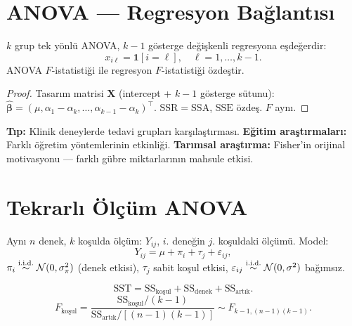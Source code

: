 \section{ANOVA --- Regresyon Bağlantısı}
\label{sec:anova_regresyon}

\begin{teorem}[ANOVA = regresyon]\label{thm:anova_regresyon}
$k$ grup tek yönlü ANOVA, $k-1$ gösterge değişkenli regresyona eşdeğerdir:
\[
  x_{i\ell} = \mathbf{1}[i=\ell], \quad \ell=1,\ldots,k-1.
\]
ANOVA $F$-istatistiği ile regresyon $F$-istatistiği özdeştir.
\end{teorem}

\begin{proof}
Tasarım matrisi $\mathbf{X}$ (intercept + $k-1$ gösterge sütunu): $\hat{\boldsymbol\beta}=(\mu,\alpha_1-\alpha_k,\ldots,\alpha_{k-1}-\alpha_k)^\top$. $\mathrm{SSR}=\mathrm{SSA}$, $\mathrm{SSE}$ özdeş. $F$ aynı.
\end{proof}

\begin{disiplinlerarasibaglan}
\textbf{Tıp:} Klinik deneylerde tedavi grupları karşılaştırması. \textbf{Eğitim araştırmaları:} Farklı öğretim yöntemlerinin etkinliği. \textbf{Tarımsal araştırma:} Fisher'in orijinal motivasyonu --- farklı gübre miktarlarının mahsule etkisi.
\end{disiplinlerarasibaglan}

\section{Tekrarlı Ölçüm ANOVA}
\label{sec:tekrarli_olcum}

\begin{tanim}\label{def:tekrarli_olcum}
Aynı $n$ denek, $k$ koşulda ölçüm: $Y_{ij}$, $i$. deneğin $j$. koşuldaki ölçümü. Model:
\[
  Y_{ij} = \mu + \pi_i + \tau_j + \varepsilon_{ij},
\]
$\pi_i\overset{\text{i.i.d.}}{\sim}\mathcal{N}(0,\sigma_\pi^2)$ (denek etkisi), $\tau_j$ sabit koşul etkisi, $\varepsilon_{ij}\overset{\text{i.i.d.}}{\sim}\mathcal{N}(0,\sigma^2)$ bağımsız.
\end{tanim}

\begin{teorem}\label{thm:tekrarli_sst}
\[
  \mathrm{SST} = \mathrm{SS}_{\text{koşul}} + \mathrm{SS}_{\text{denek}} + \mathrm{SS}_{\text{artık}}.
\]
\[
  F_{\text{koşul}} = \frac{\mathrm{SS}_{\text{koşul}}/(k-1)}{\mathrm{SS}_{\text{artık}}/[(n-1)(k-1)]} \sim F_{k-1,(n-1)(k-1)}.
\]
\end{teorem}

